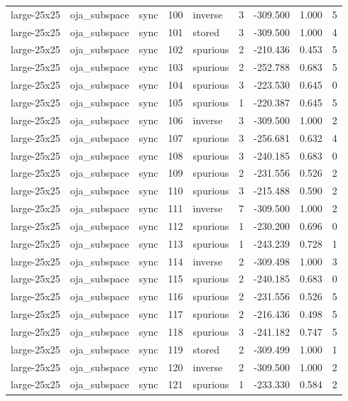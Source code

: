 \begin{tabular}{lllrlrrrr}
large-25x25 & oja\_subspace & sync & 100 & inverse & 3 & -309.500 & 1.000 & 5 \\
large-25x25 & oja\_subspace & sync & 101 & stored & 3 & -309.500 & 1.000 & 4 \\
large-25x25 & oja\_subspace & sync & 102 & spurious & 2 & -210.436 & 0.453 & 5 \\
large-25x25 & oja\_subspace & sync & 103 & spurious & 2 & -252.788 & 0.683 & 5 \\
large-25x25 & oja\_subspace & sync & 104 & spurious & 3 & -223.530 & 0.645 & 0 \\
large-25x25 & oja\_subspace & sync & 105 & spurious & 1 & -220.387 & 0.645 & 5 \\
large-25x25 & oja\_subspace & sync & 106 & inverse & 3 & -309.500 & 1.000 & 2 \\
large-25x25 & oja\_subspace & sync & 107 & spurious & 3 & -256.681 & 0.632 & 4 \\
large-25x25 & oja\_subspace & sync & 108 & spurious & 3 & -240.185 & 0.683 & 0 \\
large-25x25 & oja\_subspace & sync & 109 & spurious & 2 & -231.556 & 0.526 & 2 \\
large-25x25 & oja\_subspace & sync & 110 & spurious & 3 & -215.488 & 0.590 & 2 \\
large-25x25 & oja\_subspace & sync & 111 & inverse & 7 & -309.500 & 1.000 & 2 \\
large-25x25 & oja\_subspace & sync & 112 & spurious & 1 & -230.200 & 0.696 & 0 \\
large-25x25 & oja\_subspace & sync & 113 & spurious & 1 & -243.239 & 0.728 & 1 \\
large-25x25 & oja\_subspace & sync & 114 & inverse & 2 & -309.498 & 1.000 & 3 \\
large-25x25 & oja\_subspace & sync & 115 & spurious & 2 & -240.185 & 0.683 & 0 \\
large-25x25 & oja\_subspace & sync & 116 & spurious & 2 & -231.556 & 0.526 & 5 \\
large-25x25 & oja\_subspace & sync & 117 & spurious & 2 & -216.436 & 0.498 & 5 \\
large-25x25 & oja\_subspace & sync & 118 & spurious & 3 & -241.182 & 0.747 & 5 \\
large-25x25 & oja\_subspace & sync & 119 & stored & 2 & -309.499 & 1.000 & 1 \\
large-25x25 & oja\_subspace & sync & 120 & inverse & 2 & -309.500 & 1.000 & 2 \\
large-25x25 & oja\_subspace & sync & 121 & spurious & 1 & -233.330 & 0.584 & 2 \\

\end{tabular}
